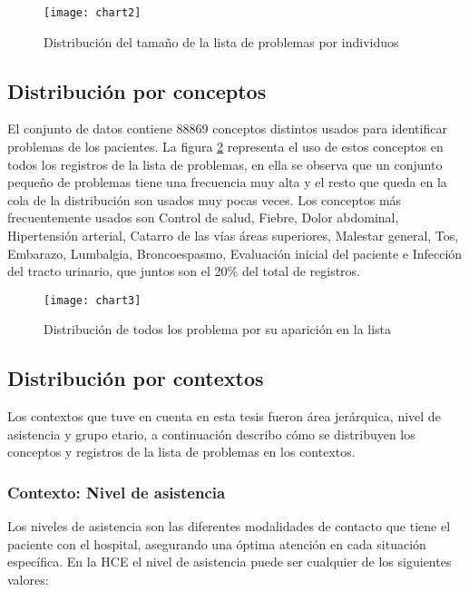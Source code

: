 \begin{figure}[htbp]
\caption{Distribución del tamaño de la lista de problemas por individuos}
\label{fig:listaIndividuos}
\centering
\texttt{[image: chart2]}
\end{figure}

\subsection{Distribución por conceptos}
El conjunto de datos contiene \num{88869} conceptos distintos usados para identificar problemas de los pacientes. La figura \ref{fig:listaProblemas} representa el uso de estos conceptos en todos los registros de la lista de problemas, en ella se observa que un conjunto pequeño de problemas tiene una frecuencia muy alta y el resto que queda en la cola de la distribución son usados muy pocas veces. Los conceptos más frecuentemente usados son Control de salud, Fiebre, Dolor abdominal,  Hipertensión arterial, Catarro de las vías áreas superiores, Malestar general, Tos, Embarazo, Lumbalgia, Broncoespasmo, Evaluación inicial del paciente e Infección del tracto urinario, que juntos son el \num{20}\% del total de registros. 

\begin{figure}[htbp]
\caption{Distribución de todos los problema por su aparición en la lista}
\label{fig:listaProblemas}
\centering
\texttt{[image: chart3]}
\end{figure}

\subsection{Distribución por contextos}

Los contextos que tuve en cuenta en esta tesis fueron área jerárquica, nivel de asistencia y grupo etario, a continuación describo cómo se distribuyen los conceptos y registros de la lista de problemas en los contextos.


\subsubsection{Contexto: Nivel de asistencia}
Los niveles de asistencia son las diferentes modalidades de contacto que tiene el paciente con el hospital, asegurando una óptima atención en cada situación específica. En la \acrshort{HCE} el nivel de asistencia puede ser cualquier de los siguientes valores:

